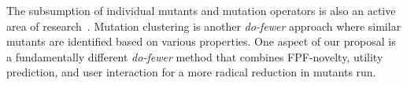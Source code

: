 The subsumption of individual mutants and mutation operators is also an active
area of research~\cite{gopinath2016measuring,shin2016theoretical,lindstrom2015redundant}.
Mutation
clustering\cite{derezinska2015toward,strug2012machine,hussain2008mutation} is
another \emph{do-fewer} approach where similar mutants are identified based on
various properties.  One aspect of our proposal is a fundamentally
different \emph{do-fewer} method that combines FPF-novelty, utility
prediction, and user interaction for a more radical reduction in
mutants run.


%

